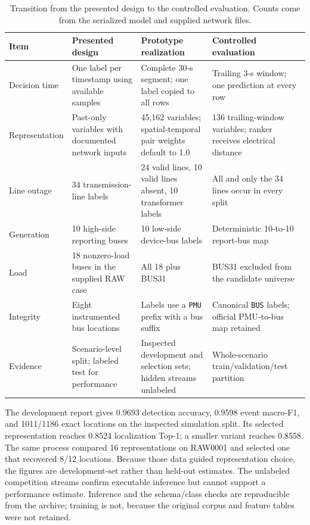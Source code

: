 \documentclass[conference]{IEEEtran}
\begin{document}
\begin{table}[!t]
\centering
\caption{Transition from the presented design to the controlled evaluation. Counts come from the serialized model and supplied network files.}
\label{tab:runtime}
\renewcommand{\arraystretch}{1.05}
\scriptsize
\begin{tabular}{@{}p{}p{}p{}p{}@{}}
\toprule
\textbf{Item} & \textbf{Presented design} & \textbf{Prototype realization} & \textbf{Controlled evaluation} \\
\midrule
Decision time & One label per timestamp using available samples & Complete 30-s segment; one label copied to all rows & Trailing 3-s window; one prediction at every row \\
Representation & Past-only variables with documented network inputs & 45,162 variables; spatial-temporal pair weights default to 1.0 & 136 trailing-window variables; ranker receives electrical distance \\
Line outage & 34 transmission-line labels & 24 valid lines, 10 valid lines absent, 10 transformer labels & All and only the 34 lines occur in every split \\
Generation & 10 high-side reporting buses & 10 low-side device-bus labels & Deterministic 10-to-10 report-bus map \\
Load & 18 nonzero-load buses in the supplied RAW case & All 18 plus BUS31 & BUS31 excluded from the candidate universe \\
Integrity & Eight instrumented bus locations & Labels use a \texttt{PMU} prefix with a bus suffix & Canonical \texttt{BUS} labels; official PMU-to-bus map retained \\
Evidence & Scenario-level split; labeled test for performance & Inspected development and selection sets; hidden streams unlabeled & Whole-scenario train/validation/test partition \\
\bottomrule
\end{tabular}
\end{table}

The development report gives 0.9693 detection accuracy, 0.9598 event macro-F1, and 1011/1186 exact locations on the inspected simulation split. Its selected representation reaches 0.8524 localization Top-1; a smaller variant reaches 0.8558. The same process compared 16 representations on RAW0001 and selected one that recovered 8/12 locations. Because those data guided representation choice, the figures are development-set rather than held-out estimates. The unlabeled competition streams confirm executable inference but cannot support a performance estimate. Inference and the schema/class checks are reproducible from the archive; training is not, because the original corpus and feature tables were not retained.
\end{document}
